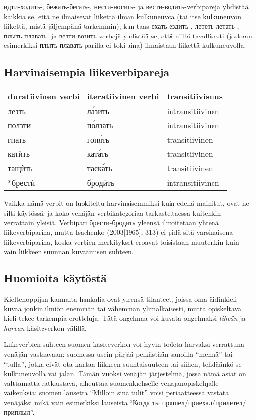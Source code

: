 \documentclass[]{scrartcl}
\begin{document}
идти-ходить-, бежать-бегать-, нести-носить- ja вести-водить-verbipareja
yhdistää kaikkia se, että ne ilmaisevat liikettä ilman kulkuneuvoa (tai
itse kulkuneuvon liikettä, mistä jäljempänä tarkemmin), kun taas
ехать-ездить-, лететь-летать-, плыть-плавать- ja везти-возить-verbejä
yhdistää se, että niillä tavallisesti (joskaan esimerkiksi
плыть-плавать-parilla ei toki aina) ilmaistaan liikettä kulkuneuvolla.

\subsection{Harvinaisempia
liikeverbipareja}\label{harvinaisempia-liikeverbipareja}

\begin{longtable}[c]{@{}lll@{}}
\toprule
duratiivinen verbi & iteratiivinen verbi &
transitiivisuus\tabularnewline
\midrule
\endhead
лезть & ла́зить & intransitiivinen\tabularnewline
ползти & по́лзать & intransitiivinen\tabularnewline
гнать & гоня́ть & transitiivinen\tabularnewline
катѝть & ката́ть & transitiivinen\tabularnewline
тащѝть & таска́ть & transitiivinen\tabularnewline
*брестѝ & бродѝть & intransitiivinen\tabularnewline
\bottomrule
\end{longtable}

Vaikka nämä verbit on luokiteltu harvinaisemmiksi kuin edellä mainitut,
ovat ne silti käytössä, ja koko venäjän verbikategoriaa tarkasteltaessa
kuitenkin verrattain yleisiä. Verbipari брести-бродить yleensä
ilmoitetaan yhtenä liikeverbiparina, mutta Isachenko (2003{[}1965{]},
313) ei pidä sitä varsinaisena liikeverbiparina, koska verbien
merkitykset eroavat toisistaan muutenkin kuin vain liikkeen suunnan
kuvaamisen suhteen.

\subsection{Huomioita käytöstä}\label{huomioita-kuxe4ytuxf6stuxe4}

Kieltenoppijan kannalta hankalia ovat yleensä tilanteet, joissa oma
äidinkieli kuvaa jonkin ilmiön enemmän tai vähemmän ylimalkaisesti,
mutta opiskeltava kieli tekee tarkempia erotteluja. Tätä ongelmaa voi
kuvata ongelmaksi \emph{tiheän} ja \emph{harvan} käsiteverkon välillä.

Liikeverbien suhteen suomen käsiteverkon voi hyvin todeta harvaksi
verrattuna venäjän vastaavaan: suomessa usein pärjää pelkästään sanoilla
``mennä'' tai ``tulla'', jotka eivät ota kantaa liikkeen suuntaisuuteen
tai siihen, tehdäänkö se kulkuneuvolla vai jalan. Tämän vuoksi venäjän
järjestelmä, jossa nämä asiat on välttämättä ratkaistava, aiheuttaa
suomenkieliselle venäjänopiskelijalle vaikeuksia: suomen lausetta
``Milloin sinä tulit'' voisi periaatteessa vastata venäjäksi mikä vain
esimerkiksi lauseista ``Когда ты пришел/приехал/прилетел/приплыл''.
\end{document}

